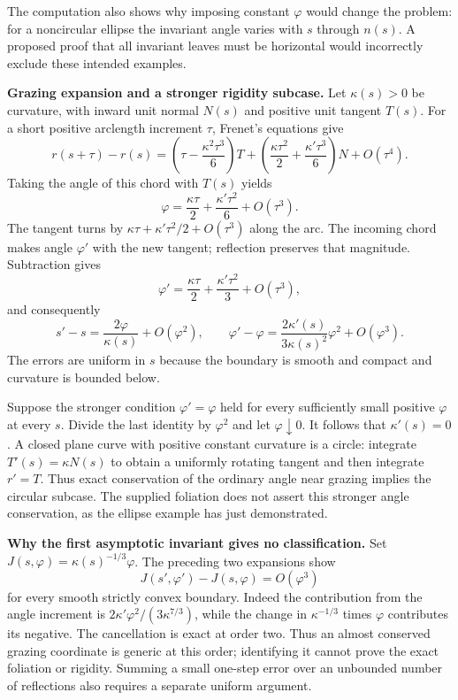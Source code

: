 \documentclass[11pt]{article}
\begin{document}
The computation also shows why imposing constant $\varphi$ would change the
problem: for a noncircular ellipse the invariant angle varies with $s$ through
$n(s)$.  A proposed proof that all invariant leaves must be horizontal would
incorrectly exclude these intended examples.

\textbf{Grazing expansion and a stronger rigidity subcase.}
Let $\kappa(s)>0$ be curvature, with inward unit normal $N(s)$ and positive
unit tangent $T(s)$.  For a short positive arclength increment $\tau$,
Frenet's equations give
\[
 r(s+\tau)-r(s)
 =\left(\tau-\frac{\kappa^2\tau^3}{6}\right)T
 +\left(\frac{\kappa\tau^2}{2}
                 +\frac{\kappa'\tau^3}{6}\right)N+O(\tau^4).
\]
Taking the angle of this chord with $T(s)$ yields
\[
 \varphi=\frac{\kappa\tau}{2}+\frac{\kappa'\tau^2}{6}
                                      +O(\tau^3).
\]
The tangent turns by $\kappa\tau+\kappa'\tau^2/2+O(\tau^3)$ along the arc.
The incoming chord makes angle $\varphi'$ with the new tangent; reflection
preserves that magnitude.  Subtraction gives
\[
 \varphi'=\frac{\kappa\tau}{2}+\frac{\kappa'\tau^2}{3}
                                      +O(\tau^3),
\]
and consequently
\[
 s'-s=\frac{2\varphi}{\kappa(s)}+O(\varphi^2),\qquad
 \varphi'-\varphi=
 \frac{2\kappa'(s)}{3\kappa(s)^2}\varphi^2+O(\varphi^3).
\]
The errors are uniform in $s$ because the boundary is smooth and compact and
curvature is bounded below.

Suppose the stronger condition $\varphi' =\varphi$ held for every sufficiently
small positive $\varphi$ at every $s$.  Divide the last identity by
$\varphi^2$ and let $\varphi\downarrow0$.  It follows that $\kappa'(s)=0$.
A closed plane curve with positive constant curvature is a circle: integrate
$T'(s)=\kappa N(s)$ to obtain a uniformly rotating tangent and then integrate
$r'=T$.  Thus exact conservation of the ordinary angle near grazing implies
the circular subcase.  The supplied foliation does not assert this stronger
angle conservation, as the ellipse example has just demonstrated.

\textbf{Why the first asymptotic invariant gives no classification.}
Set $J(s,\varphi)=\kappa(s)^{-1/3}\varphi$.
The preceding two expansions show
\[
 J(s',\varphi')-J(s,\varphi)=O(\varphi^3)
\]
for every smooth strictly convex boundary.  Indeed the contribution from the
angle increment is
$2\kappa'\varphi^2/(3\kappa^{7/3})$, while the change in
$\kappa^{-1/3}$ times $\varphi$ contributes its negative.  The cancellation
is exact at order two.  Thus an almost conserved grazing coordinate is
generic at this order; identifying it cannot prove the exact foliation or
rigidity.  Summing a small one-step error over an unbounded number of
reflections also requires a separate uniform argument.
\end{document}

